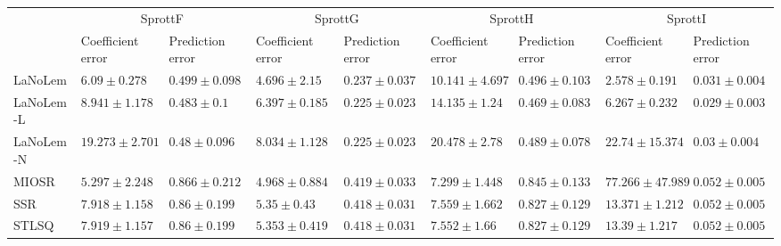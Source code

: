 \begin{table*}
{\begin{tabular}{lllllllll}
 & \multicolumn{2}{c}{SprottF} & \multicolumn{2}{c}{SprottG} & \multicolumn{2}{c}{SprottH} & \multicolumn{2}{c}{SprottI} \\
 & Coefficient error & Prediction error & Coefficient error & Prediction error & Coefficient error & Prediction error & Coefficient error & Prediction error \\
\midrule
LaNoLem & $6.09\pm 0.278$ & $0.499\pm 0.098$ & $\mathbf{4.696}\pm 2.15$ & $0.237\pm 0.037$ & $10.141\pm 4.697$ & $0.496\pm 0.103$ & $\mathbf{2.578}\pm 0.191$ & $0.031\pm 0.004$ \\
LaNoLem-L & $8.941\pm 1.178$ & $0.483\pm 0.1$ & $6.397\pm 0.185$ & $\mathbf{0.225}\pm 0.023$ & $14.135\pm 1.24$ & $\mathbf{0.469}\pm 0.083$ & $6.267\pm 0.232$ & $\mathbf{0.029}\pm 0.003$ \\
LaNoLem-N & $19.273\pm 2.701$ & $\mathbf{0.48}\pm 0.096$ & $8.034\pm 1.128$ & $0.225\pm 0.023$ & $20.478\pm 2.78$ & $0.489\pm 0.078$ & $22.74\pm 15.374$ & $0.03\pm 0.004$ \\
MIOSR & $\mathbf{5.297}\pm 2.248$ & $0.866\pm 0.212$ & $4.968\pm 0.884$ & $0.419\pm 0.033$ & $\mathbf{7.299}\pm 1.448$ & $0.845\pm 0.133$ & $77.266\pm 47.989$ & $0.052\pm 0.005$ \\
SSR & $7.918\pm 1.158$ & $0.86\pm 0.199$ & $5.35\pm 0.43$ & $0.418\pm 0.031$ & $7.559\pm 1.662$ & $0.827\pm 0.129$ & $13.371\pm 1.212$ & $0.052\pm 0.005$ \\
STLSQ & $7.919\pm 1.157$ & $0.86\pm 0.199$ & $5.353\pm 0.419$ & $0.418\pm 0.031$ & $7.552\pm 1.66$ & $0.827\pm 0.129$ & $13.39\pm 1.217$ & $0.052\pm 0.005$ \\

\midrule


\end{tabular}}
\end{table*}
